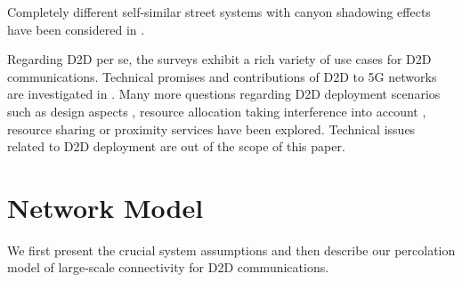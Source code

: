 \documentclass[conference]{IEEEtran}
\begin{document}
Completely different self-similar  street systems with canyon shadowing effects have been considered in \cite{jacquet2017selfIEEE, jacquet2017selfSpringer}.

Regarding D2D per se, the surveys \cite{asadi2014survey, gandotra2016device} exhibit a rich variety of use cases for D2D communications.
Technical promises and contributions of D2D to 5G networks are investigated in \cite{tehrani2014device}. Many more questions regarding D2D deployment scenarios such as design aspects \cite{fodor2012design}, resource allocation taking interference into account \cite{janis2009interference}, resource sharing \cite{yu2011resource} or proximity services \cite{lin2014overview} have been explored. Technical issues related to D2D deployment are out of the scope of this paper.
\\


\section{Network Model}
\label{s.Model}
We first present the crucial system assumptions and then describe our percolation model of large-scale connectivity for D2D communications.
\end{document}
